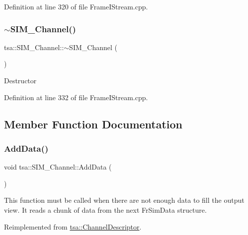 Definition at line 320 of file Frame\+I\+Stream.\+cpp.

\mbox{\label{classtsa_1_1_s_i_m___channel_a73d2a4e58efdc273a39486c35e7e1097}} 
\subsubsection{\texorpdfstring{$\sim$\+S\+I\+M\+\_\+\+Channel()}{~SIM\_Channel()}}
{\footnotesize\ttfamily tsa\+::\+S\+I\+M\+\_\+\+Channel\+::$\sim$\+S\+I\+M\+\_\+\+Channel (\begin{DoxyParamCaption}{ }\end{DoxyParamCaption})\hspace{0.3cm}{\ttfamily [virtual]}}

Destructor 

Definition at line 332 of file Frame\+I\+Stream.\+cpp.



\subsection{Member Function Documentation}
\mbox{\label{classtsa_1_1_s_i_m___channel_ada133d83befff9b1bde7e13bb78df7e0}} 
\subsubsection{\texorpdfstring{Add\+Data()}{AddData()}}
{\footnotesize\ttfamily void tsa\+::\+S\+I\+M\+\_\+\+Channel\+::\+Add\+Data (\begin{DoxyParamCaption}{ }\end{DoxyParamCaption})\hspace{0.3cm}{\ttfamily [virtual]}}

This function must be called when there are not enough data to fill the output view. It reads a chunk of data from the next Fr\+Sim\+Data structure. 

Reimplemented from \hyperlink{classtsa_1_1_channel_descriptor_aa1e001a5e712415cd4e9d66846914a56}{tsa\+::\+Channel\+Descriptor}.



